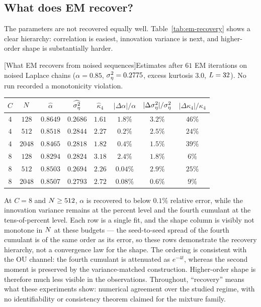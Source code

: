 \subsection{What does EM recover?}

The parameters are not recovered equally well. Table~\ref{tab:em-recovery}
shows a clear hierarchy: correlation is easiest, innovation variance is next,
and higher-order shape is substantially harder.

\begin{center}
\begin{minipage}{\linewidth}\centering
{}[What EM recovers from noised sequences]{Estimates after
$61$ EM iterations on noised Laplace chains
($\alpha=0.85$, $\sigma_\eta^2=0.2775$, excess kurtosis $3.0$, $L=32$).
No run recorded a monotonicity violation.}
\label{tab:em-recovery}
\small
\begin{tabular}{@{}ccccc ccc@{}}
\toprule
$C$ & $N$ & $\widehat\alpha$ & $\widehat{\sigma_\eta^2}$ & $\widehat\kappa_4$
& $|\Delta\alpha|/\alpha$ & $|\Delta\sigma_\eta^2|/\sigma_\eta^2$ & $|\Delta\kappa_4|/\kappa_4$ \\
\midrule
$4$ & $128$  & $0.8649$ & $0.2686$ & $1.61$ & $1.8\%$  & $3.2\%$ & $46\%$ \\
$4$ & $512$  & $0.8518$ & $0.2844$ & $2.27$ & $0.2\%$  & $2.5\%$ & $24\%$ \\
$4$ & $2048$ & $0.8465$ & $0.2818$ & $1.82$ & $0.4\%$  & $1.5\%$ & $39\%$ \\
\addlinespace
$8$ & $128$  & $0.8294$ & $0.2824$ & $3.18$ & $2.4\%$  & $1.8\%$ & $6\%$ \\
$8$ & $512$  & $0.8503$ & $0.2694$ & $2.26$ & $0.04\%$ & $2.9\%$ & $25\%$ \\
$8$ & $2048$ & $0.8507$ & $0.2793$ & $2.72$ & $0.08\%$ & $0.6\%$ & $9\%$ \\
\bottomrule
\end{tabular}
\end{minipage}
\end{center}

At $C=8$ and $N\geq512$, $\alpha$ is recovered to below $0.1\%$ relative
error, while the innovation variance remains at the percent level and the
fourth cumulant at the tens-of-percent level. Each row is a single fit, and
the shape column is visibly not monotone in $N$ at these budgets --- the
seed-to-seed spread of the fourth cumulant is of the same order as its error,
so these rows demonstrate the recovery hierarchy, not a convergence law for
the shape. The ordering is consistent with
the OU channel: the fourth cumulant is attenuated as $e^{-4t}$, whereas the
second moment is preserved by the variance-matched construction. Higher-order
shape is therefore much less visible in the observations. Throughout,
``recovery'' means what these experiments show: numerical agreement over the
studied regime, with no identifiability or consistency theorem claimed for
the mixture family.

